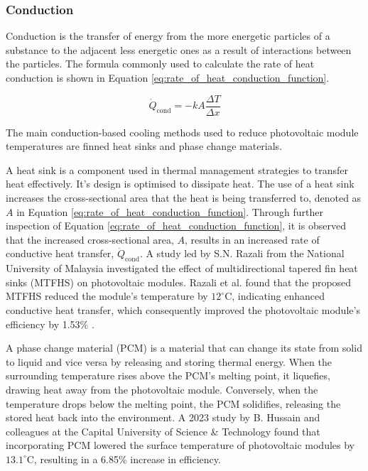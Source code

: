 \subsubsection{Conduction}
Conduction is the transfer of energy from the more energetic particles of a substance to the adjacent less energetic ones as a result of interactions between the particles. The formula commonly used to calculate the rate of heat conduction is shown in Equation \ref{eq:rate_of_heat_conduction_function}. \cite{Cengel2014IntroductionConcepts}

\begin{equation}
    \dot{Q}_\text{cond} = -kA\frac{\Delta T}{\Delta x}
    \label{eq:rate_of_heat_conduction_function}
\end{equation}

The main conduction-based cooling methods used to reduce photovoltaic module temperatures are finned heat sinks and phase change materials.\vspace{0.5em}

A heat sink is a component used in thermal management strategies to transfer heat effectively. It's design is optimised to dissipate heat. \cite{Kumar2024QualitativeReview} The use of a heat sink increases the cross-sectional area that the heat is being transferred to, denoted as $A$ in Equation \ref{eq:rate_of_heat_conduction_function}. Through further inspection of Equation \ref{eq:rate_of_heat_conduction_function}, it is observed that the increased cross-sectional area, $A$, results in an increased rate of conductive heat transfer, $\dot{Q}_\text{cond}$. A study led by S.N. Razali from the National University of Malaysia investigated the effect of multidirectional tapered fin heat sinks (MTFHS) on photovoltaic modules. Razali et al. found that the proposed MTFHS reduced the module's temperature by $12^\circ \text{C}$, indicating enhanced conductive heat transfer, which consequently improved the photovoltaic module's efficiency by 1.53\% \cite{Razali2023PerformanceMTFHS}.\vspace{0.5em}

A phase change material (PCM) is a material that can change its state from solid to liquid and vice versa by releasing and storing thermal energy. \cite{Nicholas2019ActivatedMaterial} When the surrounding temperature rises above the PCM’s melting point, it liquefies, drawing heat away from the photovoltaic module. Conversely, when the temperature drops below the melting point, the PCM solidifies, releasing the stored heat back into the environment. A 2023 study by B. Hussain and colleagues at the Capital University of Science \& Technology found that incorporating PCM lowered the surface temperature of photovoltaic modules by $13.1^\circ \text{C}$, resulting in a 6.85\% increase in efficiency. \cite{Hussain2023Phase}\vspace{0.5em}

